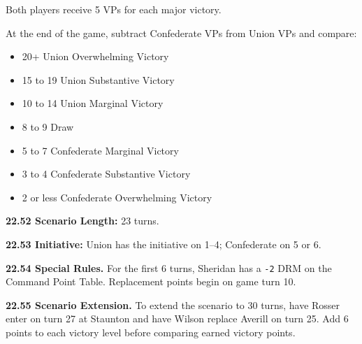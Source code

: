 Both players receive 5 VPs for each major victory.

At the end of the game, subtract Confederate VPs from Union VPs and compare:
\begin{itemize}
\item 20+ Union Overwhelming Victory
\item 15 to 19 Union Substantive Victory
\item 10 to 14 Union Marginal Victory
\item 8 to 9 Draw
\item 5 to 7 Confederate Marginal Victory
\item 3 to 4 Confederate Substantive Victory
\item 2 or less Confederate Overwhelming Victory
\end{itemize}

\textbf{22.52 Scenario Length:} 23 turns.

\textbf{22.53 Initiative:} Union has the initiative on 1--4; Confederate on 5 or 6.

\textbf{22.54 Special Rules.} For the first 6 turns, Sheridan has a \texttt{-2} DRM on the Command Point Table. Replacement points begin on game turn 10.

\textbf{22.55 Scenario Extension.} To extend the scenario to 30 turns, have Rosser enter on turn 27 at Staunton and have Wilson replace Averill on turn 25. Add 6 points to each victory level before comparing earned victory points.
